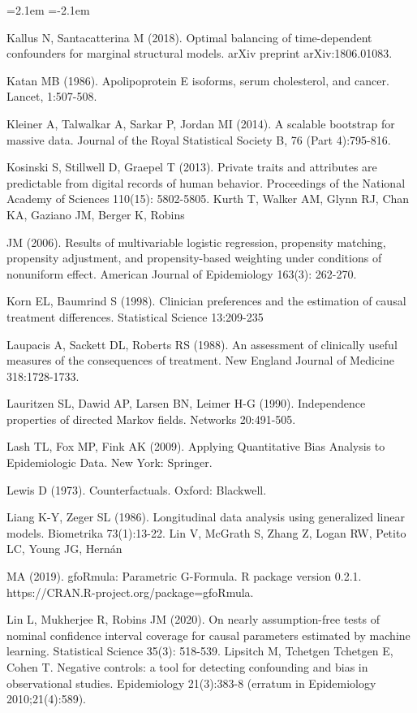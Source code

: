 \begin{list}{}{\leftmargin=2.1em   \itemindent=-2.1em \parsep=0pt \itemsep=1.6pt \topsep=4pt \rightmargin=0pt}
\item Kallus N, Santacatterina M (2018). Optimal balancing of time-dependent confounders for marginal structural models. arXiv preprint arXiv:1806.01083.
\item Katan MB (1986). Apolipoprotein E isoforms, serum cholesterol, and cancer. Lancet, 1:507-508.
\item Kleiner A, Talwalkar A, Sarkar P, Jordan MI (2014). A scalable bootstrap for massive data. Journal of the Royal Statistical Society B, 76 (Part 4):795-816.
\item Kosinski S, Stillwell D, Graepel T (2013). Private traits and attributes are predictable from digital records of human behavior. Proceedings of the National Academy of Sciences 110(15): 5802-5805. Kurth T, Walker AM, Glynn RJ, Chan KA, Gaziano JM, Berger K, Robins
\item JM (2006). Results of multivariable logistic regression, propensity matching, propensity adjustment, and propensity-based weighting under conditions of nonuniform effect. American Journal of Epidemiology 163(3): 262-270.
\item Korn EL, Baumrind S (1998). Clinician preferences and the estimation of causal treatment differences. Statistical Science 13:209-235
\item Laupacis A, Sackett DL, Roberts RS (1988). An assessment of clinically useful measures of the consequences of treatment. New England Journal of Medicine 318:1728-1733.
\item Lauritzen SL, Dawid AP, Larsen BN, Leimer H-G (1990). Independence properties of directed Markov fields. Networks 20:491-505.
\item Lash TL, Fox MP, Fink AK (2009). Applying Quantitative Bias Analysis to Epidemiologic Data. New York: Springer.
\item Lewis D (1973). Counterfactuals. Oxford: Blackwell.
\item Liang K-Y, Zeger SL (1986). Longitudinal data analysis using generalized linear models. Biometrika 73(1):13-22. Lin V, McGrath S, Zhang Z, Logan RW, Petito LC, Young JG, Hernán
\item MA (2019). gfoRmula: Parametric G-Formula. R package version 0.2.1. https://CRAN.R-project.org/package=gfoRmula.
\item Lin L, Mukherjee R, Robins JM (2020). On nearly assumption-free tests of nominal confidence interval coverage for causal parameters estimated by machine learning. Statistical Science 35(3): 518-539. Lipsitch M, Tchetgen Tchetgen E, Cohen T. Negative controls: a tool for detecting confounding and bias in observational studies. Epidemiology 21(3):383-8 (erratum in Epidemiology 2010;21(4):589).

\end{list}
